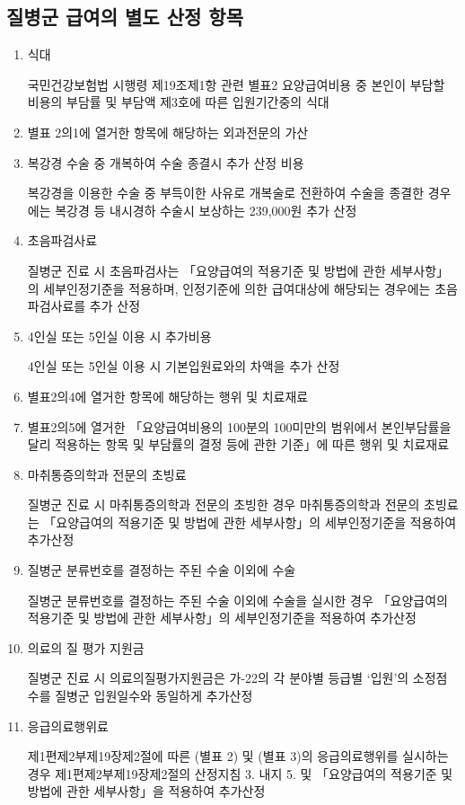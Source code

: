 \clearpage
\subsection{질병군 급여의 별도 산정 항목}
\begin{enumerate}[가.]\tightlist
\item 식대 \par
국민건강보험법 시행령 제19조제1항 관련 별표2 요양급여비용 중 본인이 부담할 비용의 부담률 및 부담액 제3호에 따른 입원기간중의 식대
\item 별표 2의1에 열거한 항목에 해당하는 외과전문의 가산
\item 복강경 수술 중 개복하여 수술 종결시 추가 산정 비용 \par
복강경을 이용한 수술 중 부득이한 사유로 개복술로 전환하여 수술을 종결한 경우에는 복강경 등 내시경하 수술시 보상하는 239,000원 추가 산정
\item 초음파검사료\par
질병군 진료 시 초음파검사는 「요양급여의 적용기준 및 방법에 관한 세부사항」의 세부인정기준을 적용하며, 인정기준에 의한 급여대상에 해당되는 경우에는 초음파검사료를 추가 산정
\item 4인실 또는 5인실 이용 시 추가비용 \par
4인실 또는 5인실 이용 시 기본입원료와의 차액을 추가 산정
\item 별표2의4에 열거한 항목에 해당하는 행위 및 치료재료
\item 별표2의5에 열거한 「요양급여비용의 100분의 100미만의 범위에서 본인부담률을 달리 적용하는 항목 및 부담률의 결정 등에 관한 기준」에 따른 행위 및 치료재료
\item 마취통증의학과 전문의 초빙료\par
질병군 진료 시 마취통증의학과 전문의 초빙한 경우 마취통증의학과 전문의 초빙료는 「요양급여의 적용기준 및 방법에 관한 세부사항」의 세부인정기준을 적용하여 추가산정
\item 질병군 분류번호를 결정하는 주된 수술 이외에 수술\par
질병군 분류번호를 결정하는 주된 수술 이외에 수술을 실시한 경우 「요양급여의 적용기준 및 방법에 관한 세부사항」의 세부인정기준을 적용하여 추가산정
\item 의료의 질 평가 지원금 \par
질병군 진료 시 의료의질평가지원금은 가-22의 각 분야별 등급별 ‘입원’의 소정점수를 질병군 입원일수와 동일하게 추가산정
\item 응급의료행위료 \par
제1편제2부제19장제2절에 따른 (별표 2) 및 (별표 3)의 응급의료행위를 실시하는 경우 제1편제2부제19장제2절의 산정지침 3. 내지 5. 및 「요양급여의 적용기준 및 방법에 관한 세부사항」을 적용하여 추가산정

\end{enumerate}
